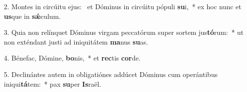 2. Montes in circúitu ejus: \dag\  et Dóminus in circúitu pópuli \textbf{su}i,~*  ex hoc nunc et \textbf{us}que in \textbf{sǽ}culum.\

3. Quia non relínquet Dóminus virgam peccatórum super sortem jus\textbf{tó}rum:~*  ut non exténdant justi ad iniquitátem \textbf{ma}nus \textbf{su}as.\

4. Bénefac, Dómine, \textbf{bo}nis,~*  et \textbf{rec}tis \textbf{cor}de.\

5. Declinántes autem in obligatiónes addúcet Dóminus cum operántibus iniqui\textbf{tá}tem:~*  pax \textbf{su}per \textbf{Is}raël.\

